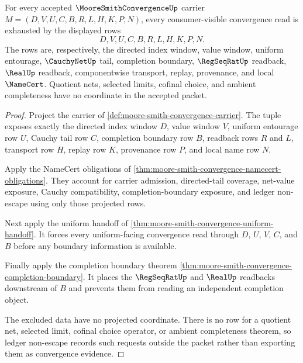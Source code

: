 \begin{theorem}
\label{thm:moore-smith-convergence-obligation-exhaustion}
For every accepted $\MooreSmithConvergenceUp$ carrier $M=(D,V,U,C,B,R,L,H,K,P,N)$, every consumer-visible convergence read is exhausted by the displayed rows
$$
D,V,U,C,B,R,L,H,K,P,N .
$$
The rows are, respectively, the directed index window, value window, uniform entourage, $\CauchyNetUp$ tail, completion boundary, $\RegSeqRatUp$ readback, $\RealUp$ readback, componentwise transport, replay, provenance, and local $\NameCert$. Quotient nets, selected limits, cofinal choice, and ambient completeness have no coordinate in the accepted packet.
\end{theorem}
\begin{proof}
Project the carrier of \autoref{def:moore-smith-convergence-carrier}. The tuple exposes exactly the directed index window $D$, value window $V$, uniform entourage row $U$, Cauchy tail row $C$, completion boundary row $B$, readback rows $R$ and $L$, transport row $H$, replay row $K$, provenance row $P$, and local name row $N$.

Apply the NameCert obligations of \autoref{thm:moore-smith-convergence-namecert-obligations}. They account for carrier admission, directed-tail coverage, net-value exposure, Cauchy compatibility, completion-boundary exposure, and ledger non-escape using only those projected rows.

Next apply the uniform handoff of \autoref{thm:moore-smith-convergence-uniform-handoff}. It forces every uniform-facing convergence read through $D$, $U$, $V$, $C$, and $B$ before any boundary information is available.

Finally apply the completion boundary theorem \autoref{thm:moore-smith-convergence-completion-boundary}. It places the $\RegSeqRatUp$ and $\RealUp$ readbacks downstream of $B$ and prevents them from reading an independent completion object.

The excluded data have no projected coordinate. There is no row for a quotient net, selected limit, cofinal choice operator, or ambient completeness theorem, so ledger non-escape records such requests outside the packet rather than exporting them as convergence evidence.
\end{proof}

